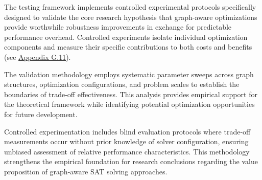 The testing framework implements controlled experimental protocols specifically designed to validate the core research hypothesis that graph-aware optimizations provide worthwhile robustness improvements in exchange for predictable performance overhead. Controlled experiments isolate individual optimization components and measure their specific contributions to both costs and benefits (see \hyperref[appendix:controlled-experiments]{Appendix G.11}).

The validation methodology employs systematic parameter sweeps across graph structures, optimization configurations, and problem scales to establish the boundaries of trade-off effectiveness. This analysis provides empirical support for the theoretical framework while identifying potential optimization opportunities for future development.

Controlled experimentation includes blind evaluation protocols where trade-off measurements occur without prior knowledge of solver configuration, ensuring unbiased assessment of relative performance characteristics. This methodology strengthens the empirical foundation for research conclusions regarding the value proposition of graph-aware SAT solving approaches.